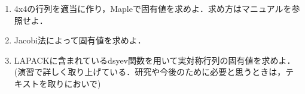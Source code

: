 \begin{enumerate}
\item 4x4の行列を適当に作り，Mapleで固有値を求めよ．求め方はマニュアルを参照せよ．
\item Jacobi法によって固有値を求めよ．
\item LAPACKに含まれているdsyev関数を用いて実対称行列の固有値を求めよ．(演習で詳しく取り上げている．研究や今後のために必要と思うときは，テキストを取りにおいで)
\end{enumerate}